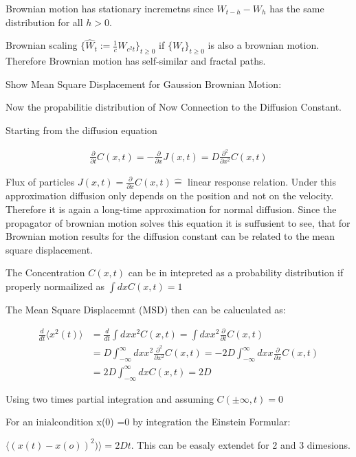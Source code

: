 \documentclass[
  a4paper,BCOR10mm,oneside,
  bibtotoc,idxtotoc,
  headsepline,footsepline,%
  fleqn,openbib
]{scrbook}
\begin{document}
Brownian motion has stationary incremetns since ${W_{t-h}-W_{h}}$ has the same distribution for all $h>0$.

Brownian scaling $\{\hat{W}_t := \frac{1}{c} W_{c^2 t} \}_{t\geq0}$ if $\{W_t\}_{t \geq 0}$  is also a brownian motion. Therefore Brownian motion has self-similar and fractal paths.

Show Mean Square Displacement for Gaussion Brownian Motion:

Now the propabilitie distribution of 
Now Connection to the Diffusion Constant. 

Starting from the  diffusion equation 

\begin{align}
 \frac{\partial }{\partial t} C(x,t) = - \frac{\partial }{\partial x} J (x,t) = D  \frac{\partial^2 }{\partial x^2} C(x,t)
\end{align}

Flux of particles  $J(x,t)=\frac{\partial }{\partial x} C(x,t)  \hat{=} $ linear response relation. 
Under this approximation diffusion only depends on the position and not on the velocity. Therefore it is again a long-time approximation for normal diffusion. Since the propagator of brownian motion solves this equation it is suffusient to see, that for Brownian motion results for the diffusion constant can be related to the mean square displacement.

The Concentration $C(x,t)$ can be in intepreted as a probability distribution if properly normailized as $\int dx C(x,t)=1$



The Mean Square Displacemnt (MSD) then can be caluculated as:

\begin{align}
 \frac{d}{dt} \langle x^2(t)\rangle & =\frac{d}{dt} \int dx x^2 C(x,t)=\int dx x^2 \frac{\partial}{\partial t} C(x,t) \\
&= D \int_{-\infty}^{\infty}dx x^2 \frac{\partial^2 }{\partial x^2} C(x,t) = -2 D \int_{-\infty}^{\infty} dx x \frac{\partial }{\partial x} C(x,t) \\ &= 2 D \int_{-\infty}^{\infty} dx C(x,t) =2 D
\end{align}

Using two times partial integration and assuming $C(\pm \infty,t)=0$

For an inialcondition x(0) =0 by integration the Einstein Formular:

$\langle (x(t)-x(o))^2)\rangle= 2Dt$. This can be easaly extendet for 2 and 3 dimesions. 
\end{document}
